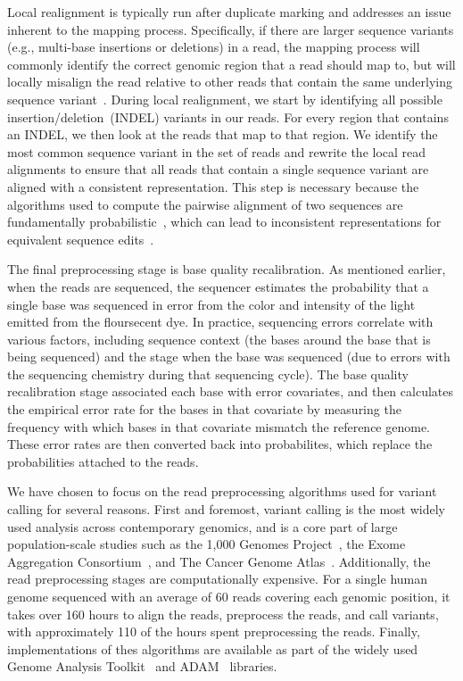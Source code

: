 \documentclass[phd]{ucbthesis}
\begin{document}
Local realignment is typically run after duplicate marking and addresses an
issue inherent to the mapping process. Specifically, if there are larger
sequence variants (e.g., multi-base insertions or deletions) in a read, the
mapping process will commonly identify the correct genomic region that a read
should map to, but will locally misalign the read relative to other reads that
contain the same underlying sequence variant~\cite{depristo11}. During local
realignment, we start by identifying all possible insertion/deletion~(INDEL)
variants in our reads. For every region that contains an INDEL, we then look
at the reads that map to that region. We identify the most common sequence
variant in the set of reads and rewrite the local read alignments to ensure that
all reads that contain a single sequence variant are aligned with a consistent
representation. This step is necessary because the algorithms used to compute
the pairwise alignment of two sequences are fundamentally
probabilistic~\cite{durbin98, smith81, ukkonen85}, which can lead to
inconsistent representations for equivalent sequence edits~\cite{li14}.

The final preprocessing stage is base quality recalibration. As mentioned
earlier, when the reads are sequenced, the sequencer estimates the probability
that a single base was sequenced in error from the color and intensity of the
light emitted from the floursecent dye. In practice, sequencing errors correlate
with various factors, including sequence context (the bases around the base that
is being sequenced) and the stage when the base was sequenced (due to errors
with the sequencing chemistry during that sequencing cycle). The base quality
recalibration stage associated each base with error covariates, and then
calculates the empirical error rate for the bases in that covariate by measuring
the frequency with which bases in that covariate mismatch the reference genome.
These error rates are then converted back into probabilites, which replace the
probabilities attached to the reads.

We have chosen to focus on the read preprocessing algorithms used for variant
calling for several reasons. First and foremost, variant calling is the most
widely used analysis across contemporary genomics, and is a core part of large
population-scale studies such as the 1,000 Genomes Project~\cite{1kg12, 1kg},
the Exome Aggregation Consortium~\cite{lek16}, and The Cancer Genome
Atlas~\cite{weinstein13}. Additionally, the read preprocessing stages are
computationally expensive. For a single human genome sequenced with
an average of 60 reads covering each genomic position, it takes over 160 hours
to align the reads, preprocess the reads, and call variants, with approximately
110 of the hours spent preprocessing the reads. Finally, implementations of thes
algorithms are available as part of the widely used {Genome Analysis
Toolkit}~\cite{mckenna10, depristo11} and {ADAM}~\cite{massie13,
nothaft15} libraries.
\end{document}
